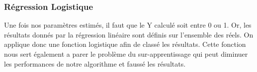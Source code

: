 \subsubsection{Régression Logistique}

Une fois nos paramètres estimés, il faut que le Y calculé soit entre 0 ou 1. Or, les résultats donnés par la régression linéaire sont définis sur l'ensemble des réels. On applique donc une fonction logistique afin de classé les résultats. 
Cette fonction nous sert également a parer le problème du sur-apprentissage qui peut diminuer les performances de notre algorithme et faussé les résultats. 

